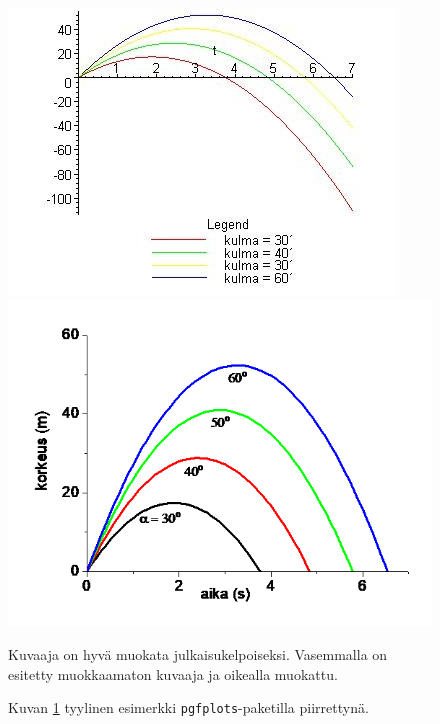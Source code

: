 \begin{figure}
\centering
\includegraphics[width=\textwidth]{images/bad-example.jpg}
\includegraphics[width=\textwidth]{images/good-example.png}
\caption[Tämä on lyhyt kuvateksti.]{Kuvaaja on hyvä muokata julkaisukelpoiseksi. Vasemmalla on esitetty muokkaamaton kuvaaja ja oikealla muokattu.}
\label{fig:huolittelu}
\end{figure}

\begin{figure}
\centering
%
\caption{Kuvan \ref{fig:huolittelu} tyylinen esimerkki \texttt{pgfplots}-paketilla piirrettynä.}
\label{fig:pgf-esimerkki}
\end{figure}

